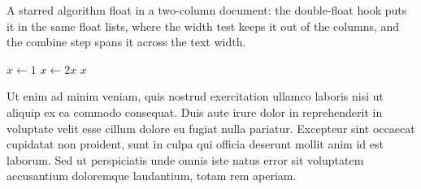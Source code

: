\documentclass[twocolumn]{article}
\begin{document}
A starred algorithm float in a two-column document: the double-float hook puts it
in the same float lists, where the width test keeps it out of the
columns, and the combine step spans it across the text width.

\begin{algorithm*}[t]
\caption{A wide algorithm}
\begin{algorithmic}[1]
\State $x \gets 1$
\State $x \gets 2x$
\EndWhile
\State \Return $x$
\end{algorithmic}
\end{algorithm*}

Ut enim ad minim veniam, quis nostrud exercitation ullamco laboris nisi ut
aliquip ex ea commodo consequat. Duis aute irure dolor in reprehenderit in
voluptate velit esse cillum dolore eu fugiat nulla pariatur. Excepteur sint
occaecat cupidatat non proident, sunt in culpa qui officia deserunt mollit
anim id est laborum. Sed ut perspiciatis unde omnis iste natus error sit
voluptatem accusantium doloremque laudantium, totam rem aperiam.
\end{document}
